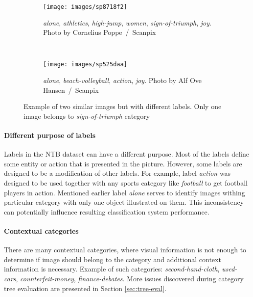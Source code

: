 \begin{figure}[ht]
    \centering
    \begin{subfigure}[a]{0.3\textwidth}
        \texttt{[image: images/sp8718f2]}
        \caption{\textit{alone}, \textit{athletics}, \textit{high-jump}, \textit{women}, \textit{sign-of-triumph}, \textit{joy}. Photo by Cornelius Poppe~/~Scanpix}
        \label{fig:with-sign-of-triumph}
    \end{subfigure}
    ~
    \begin{subfigure}[a]{0.3\textwidth}
        \texttt{[image: images/sp525daa]}
        \caption{\textit{alone}, \textit{beach-volleyball}, \textit{action}, \textit{joy}. Photo by Alf Ove Hansen~/~Scanpix}
        \label{fig:without-sign-of-triumph}
    \end{subfigure}
    \caption[Example of two similar images but with different labels]{Example of two similar images but with different labels. Only one image belongs to \textit{sign-of-triumph} category}
    \label{fig:sign-of-triumph-example}
\end{figure}

\paragraph{Different purpose of labels}
Labels in the NTB dataset can have a different purpose. Most of the labels define some entity or action that is presented in the picture. However, some labels are designed to be a modification of other labels. For example, label \textit{action} was designed to be used together with any sports category like \textit{football} to get football players in action. Mentioned earlier label \textit{alone} serves to identify images withing particular category with only one object illustrated on them. This inconsistency can potentially influence resulting classification system performance.

\paragraph{Contextual categories}
There are many contextual categories, where visual information is not enough to determine if image should belong to the category and additional context information is necessary. Example of such categories: \textit{second-hand-cloth}, \textit{used-cars}, \textit{counterfeit-money}, \textit{finance-debates}. More issues discovered during category tree evaluation are presented in Section \ref{sec:tree-eval}.

